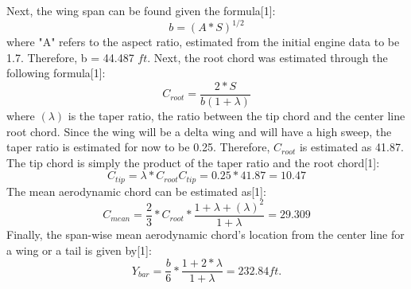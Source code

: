 \documentclass{article}
\begin{document}
Next, the wing span can be found given the formula[1]: 
\begin{equation}
b = (A*S)^{1/2}
\end{equation}
where "A" refers to the aspect ratio, estimated from the initial engine data to be 1.7. Therefore, b = 44.487 ${ft}$. 
Next, the root chord was estimated through the following formula[1]: 
\begin{equation}
C_{root} = \frac{2*S}{b(1 + \lambda)}
\end{equation}
where ${(\lambda)}$ is the taper ratio, the ratio between the tip chord and the center line root chord. Since the wing will be a delta wing and will have a high sweep, the taper ratio is estimated for now to be 0.25. Therefore, $C_{root}$ is estimated as 41.87. 
The tip chord is simply the product of the taper ratio and the root chord[1]: 
\begin{equation} 
C_{tip} = {\lambda}*C_{root}
C_{tip} = 0.25 * 41.87 = 10.47
\end{equation}
The mean aerodynamic chord can be estimated as[1]: 
\begin{equation}
C_{mean} = \frac{2}{3}*C_{root}*\frac{1+\lambda+(\lambda)^2}{1+\lambda} = 29.309
\end{equation}
Finally, the span-wise mean aerodynamic chord's location from the center line for a wing or a tail is given by[1]: 
\begin {equation}
Y_{bar} = \frac{b}{6}*\frac{1+2*\lambda}{1+\lambda} = 232.84 ft. 
\end{equation}



\end{document}
